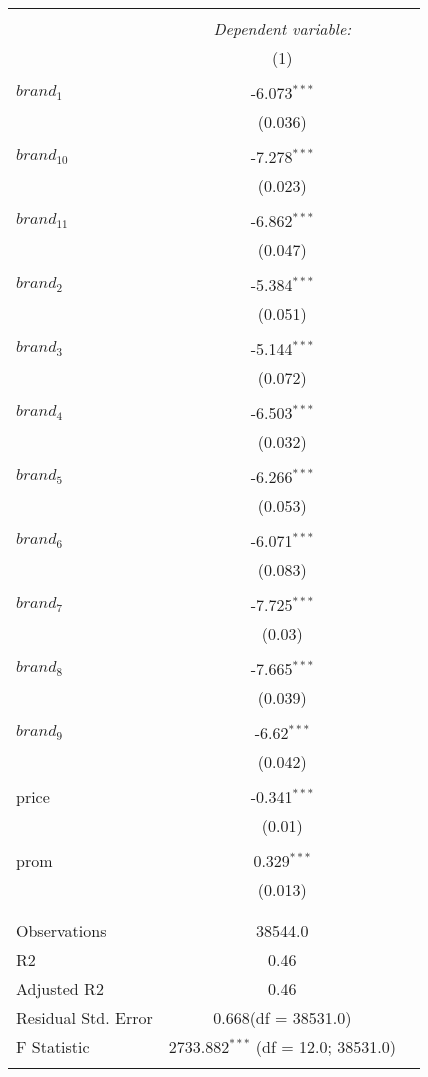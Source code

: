 \documentclass[10pt]{article}
\begin{document}
\newpage

\begin{table}[!htbp] \centering
  \label{}
\begin{tabular}{@{\extracolsep{5pt}}lcc}
\\[-1.8ex]\hline
\hline \\[-1.8ex]
& \multicolumn{1}{c}{\textit{Dependent variable:}} \
\cr \cline{1-2}
\\[-1.8ex] & (1) \\
\hline \\[-1.8ex]
 $brand_1$ & -6.073$^{***}$ \\
  & (0.036) \\
  & \\
 $brand_{10}$ & -7.278$^{***}$ \\
  & (0.023) \\
  & \\
 $brand_{11}$ & -6.862$^{***}$ \\
  & (0.047) \\
  & \\
 $brand_2$ & -5.384$^{***}$ \\
  & (0.051) \\
  & \\
 $brand_3$ & -5.144$^{***}$ \\
  & (0.072) \\
  & \\
 $brand_4$ & -6.503$^{***}$ \\
  & (0.032) \\
  & \\
 $brand_5$ & -6.266$^{***}$ \\
  & (0.053) \\
  & \\
 $brand_6$ & -6.071$^{***}$ \\
  & (0.083) \\
  & \\
 $brand_7$ & -7.725$^{***}$ \\
  & (0.03) \\
  & \\
 $brand_8$ & -7.665$^{***}$ \\
  & (0.039) \\
  & \\
 $brand_9$ & -6.62$^{***}$ \\
  & (0.042) \\
  & \\
 price & -0.341$^{***}$ \\
  & (0.01) \\
  & \\
 prom & 0.329$^{***}$ \\
  & (0.013) \\
  & \\
\hline \\[-1.8ex]
 Observations & 38544.0 \\
 R${2}$ & 0.46 \\
 Adjusted R${2}$ & 0.46 \\
 Residual Std. Error & 0.668(df = 38531.0)  \\
 F Statistic & 2733.882$^{***}$ (df = 12.0; 38531.0) \\
\hline
\hline \\[-1.8ex]
\end{tabular}
\end{table}
\end{document}

